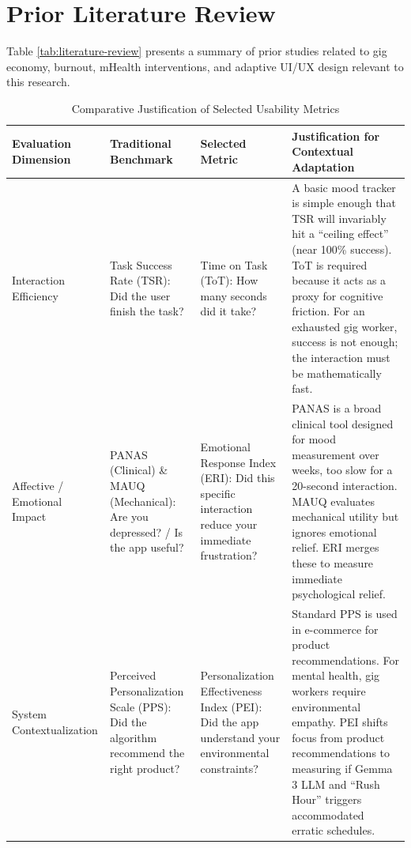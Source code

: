 \section{Prior Literature Review}

Table \ref{tab:literature-review} presents a summary of prior studies related to gig economy, burnout, mHealth interventions, and adaptive UI/UX design relevant to this research.

\begin{table}[p]
\centering
\footnotesize
\setlength{\tabcolsep}{4pt}
\renewcommand{\arraystretch}{1.15}
\caption{Comparative Justification of Selected Usability Metrics}
\label{tab:metrics-comparison}
\begin{tabular}{>{\raggedright\arraybackslash}p{}
			  >{\raggedright\arraybackslash}p{}
			  >{\raggedright\arraybackslash}p{}
			  >{\raggedright\arraybackslash}p{}}
\hline
\textbf{Evaluation Dimension} & \textbf{Traditional Benchmark} & \textbf{Selected Metric} & \textbf{Justification for Contextual Adaptation} \\
\hline
Interaction Efficiency & Task Success Rate (TSR): Did the user finish the task? & Time on Task (ToT): How many seconds did it take? & A basic mood tracker is simple enough that TSR will invariably hit a ``ceiling effect'' (near 100\% success). ToT is required because it acts as a proxy for cognitive friction. For an exhausted gig worker, success is not enough; the interaction must be mathematically fast. \\
\hline
Affective / Emotional Impact & PANAS (Clinical) \& MAUQ (Mechanical): Are you depressed? / Is the app useful? & Emotional Response Index (ERI): Did this specific interaction reduce your immediate frustration? & PANAS is a broad clinical tool designed for mood measurement over weeks, too slow for a 20-second interaction. MAUQ evaluates mechanical utility but ignores emotional relief. ERI merges these to measure immediate psychological relief. \\
\hline
System Contextualization & Perceived Personalization Scale (PPS): Did the algorithm recommend the right product? & Personalization Effectiveness Index (PEI): Did the app understand your environmental constraints? & Standard PPS is used in e-commerce for product recommendations. For mental health, gig workers require environmental empathy. PEI shifts focus from product recommendations to measuring if Gemma 3 LLM and ``Rush Hour'' triggers accommodated erratic schedules. \\
\hline
\end{tabular}
\end{table}

